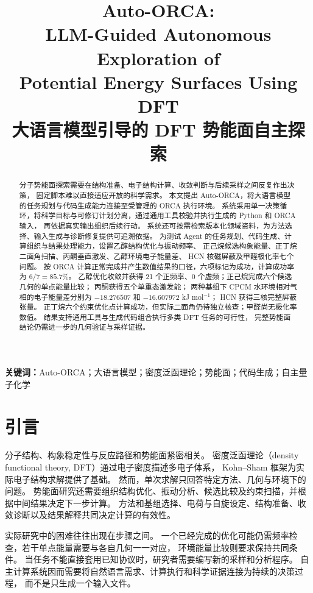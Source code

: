 \documentclass[UTF8,fontset=fandol,a4paper,11pt]{ctexart}
\title{\vspace{-1.3cm}\bfseries Auto-ORCA:\\[0.3em]
 \Large LLM-Guided Autonomous Exploration of\\
 Potential Energy Surfaces Using DFT\\[0.6em]
 \large 大语言模型引导的 DFT 势能面自主探索}
\author{}
\date{}
\begin{document}
\maketitle
\vspace{-1.6cm}
\begin{abstract}
  分子势能面探索需要在结构准备、电子结构计算、收敛判断与后续采样之间反复作出决策，%
  固定脚本难以直接适应开放的科学需求。%
  本文提出 Auto-ORCA，将大语言模型的任务规划与代码生成能力连接至受管理的 ORCA 执行环境。%
  系统采用单一决策循环，将科学目标与可修订计划分离，通过通用工具校验并执行生成的 Python 和 ORCA 输入，%
  再依据真实输出组织后续行动。%
  系统还可按需检索版本化领域资料，为方法选择、输入生成与诊断修复提供可追溯依据。%
  为测试 Agent 的任务规划、代码生成、计算组织与结果处理能力，设置乙醇结构优化与振动频率、%
  正己烷候选构象能量、正丁烷二面角扫描、丙酮垂直激发、乙醇环境电子能量差、%
  HCN 核磁屏蔽及甲醛极化率七个问题。%
  按 ORCA 计算正常完成并产生数值结果的口径，六项标记为成功，计算成功率为 $6/7=85.7\%$。%
  乙醇优化收敛并获得 21 个正频率、0 个虚频；正己烷完成六个候选几何的单点能量比较；%
  丙酮获得五个单重态激发能；%
  两种基组下 CPCM 水环境相对气相的电子能量差分别为 $-18.276507$ 和 $-16.607972$ kJ mol$^{-1}$；%
  HCN 获得三核完整屏蔽张量。%
  正丁烷六个约束优化点计算成功，但实际二面角仍待独立核查；甲醛尚无极化率数值。%
  结果支持通用工具与生成代码组合执行多类 DFT 任务的可行性，%
  完整势能面结论仍需进一步的几何验证与采样证据。
\end{abstract}
\noindent\textbf{关键词：}Auto-ORCA；大语言模型；密度泛函理论；势能面；代码生成；自主量子化学

\section{引言}
分子结构、构象稳定性与反应路径和势能面紧密相关。%
密度泛函理论（density functional theory, DFT）通过电子密度描述多电子体系，%
Kohn--Sham 框架为实际电子结构求解提供了基础\cite{hk,ks}。%
然而，单次求解只回答特定方法、几何与环境下的问题。%
势能面研究还需要组织结构优化、振动分析、候选比较及约束扫描，并根据中间结果决定下一步计算。%
方法和基组选择、电荷与自旋设定、结构准备、收敛诊断以及结果解释共同决定计算的有效性。

实际研究中的困难往往出现在步骤之间。%
一个已经完成的优化可能仍需频率检查，若干单点能量需要与各自几何一一对应，%
环境能量比较则要求保持共同条件。%
当任务不能直接套用已知协议时，研究者需要编写新的采样和分析程序。%
自主计算系统因而需要将自然语言需求、计算执行和科学证据连接为持续的决策过程，%
而不是只生成一个输入文件。
\end{document}
